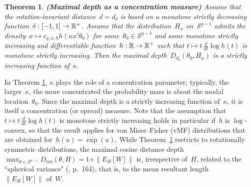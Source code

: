 \documentclass[usenames,dvipsnames]{article}
\newtheorem{thm}{Theorem}
\begin{document}
\begin{thm}{\textbf{(Maximal depth as a concentration measure)}} 
\label{propconcentr}
Assume that the rotation-invariant distance~$d=d_\delta$ is based on a monotone strictly decreasing function~$\delta:[-1,1]\to \mathbb{R}^+$. Assume that the distribution~$H_\kappa$ on~$\mathcal{S}^{q-1}$ admits the density~$x\mapsto c_{q,\kappa,h} h(\kappa x'\theta_0)$ for some~$\theta_0\in\mathcal{S}^{q-1}$ and some monotone strictly increasing and differentiable function~$h:\mathbb{R}\to \mathbb{R}^+$ such that
$
t \mapsto t\,\frac{d}{dt}\log h(t)
$
is monotone strictly increasing. Then the maximal depth~$D_{d_{\delta}}(\theta_0, H_\kappa)$ is a strictly increasing function of~$\kappa$.  
\end{thm}
In Theorem \ref{propconcentr}, $\kappa$ plays the role of a concentration parameter; typically, the larger~$\kappa$,  the more concentrated the probability mass is about the modal location~$\theta_0$. Since the maximal depth is a strictly increasing function of~$\kappa$, it is itself a concentration (or spread) measure. Note that the assumption that $t \mapsto t\,\frac{d}{dt}\log h(t)
$ is monotone strictly increasing holds in particular if~$h$ is $\log$-convex, so that the result applies for von Mises--Fisher (vMF) distributions that are obtained for~$h\left(u\right)=\exp\left(u\right)$. While Theorem~\ref{propconcentr} restricts to rotationally symmetric distributions, the maximal cosine distance depth~$\max_{\theta\in\mathcal{S}^{q-1}} D_{\cos}(\theta,H)=1+\|E_{H}[W]\|$ is, irrespective of~$H$, related to the ``spherical variance" (\citealp{MarJup2000}, p.~164), that is, to the mean resultant length~$\|E_H[W]\|$ of~$W$.
\end{document}
